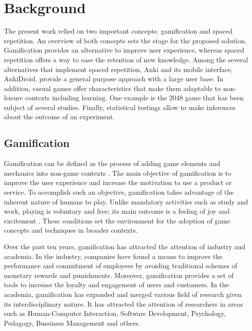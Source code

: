 
\chapter{Background} %

\label{back} %

The present work relied on two important concepts: gamification and spaced repetition. An overview of both concepts sets the stage for the proposed solution. Gamification provides an alternative to improve user experience, whereas spaced repetition offers a way to ease the retention of new knowledge. Among the several alternatives that implement spaced repetition, Anki and its mobile interface, AnkiDroid, provide a general purpose approach with a large user base. In addition, casual games offer characteristics that make them adaptable to non-leisure contexts including learning. One example is the 2048 game \citep{uberspot2017game} that has been subject of several studies. Finally, statistical testings allow to make inferences about the outcome of an experiment.

\section{Gamification}
Gamification can be defined as the process of adding game elements and mechanics into non-game contexts \citep{deterding2011game}. The main objective of gamification is to improve the user experience and increase the motivation to use a product or service. To accomplish such an objective, gamification takes advantage of the inherent nature of humans to play. Unlike mandatory activities such as study and work, playing is voluntary and free; its main outcome is a feeling of joy and excitement \citep{johan1950homo}. These conditions set the environment for the adoption of game concepts and techniques in broader contexts.

Over the past ten years, gamification has attracted the attention of industry and academia. In the industry, companies have found a means to improve the performance and commitment of employees by avoiding traditional schemes of monetary rewards and punishments. Moreover, gamification provides a set of tools to increase the loyalty and engagement of users and customers. In the academia, gamification has expanded and merged various field of research given its interdisciplinary nature. It has attracted the attention of researchers in areas such as Human-Computer Interaction, Software Development, Psychology, Pedagogy, Bussiness Management and others.

